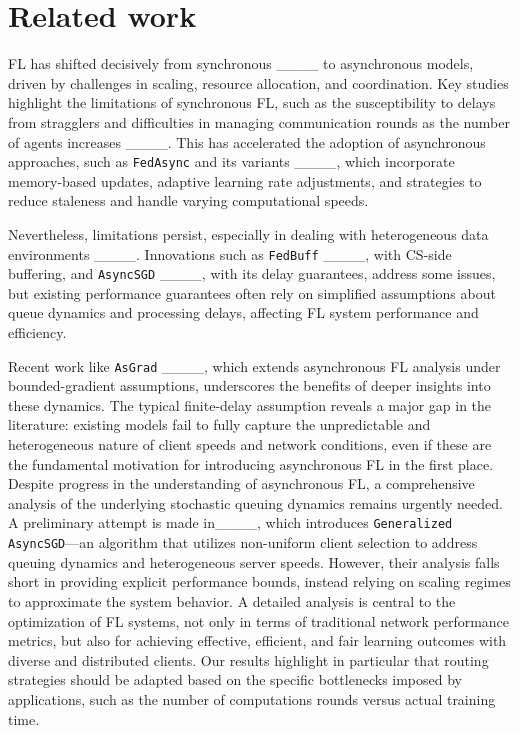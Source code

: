 \section{Related work}
\label{sec:related-work}

\gls{FL} has shifted decisively from synchronous ____ to asynchronous models, driven by challenges in scaling, resource allocation, and coordination. Key studies highlight the limitations of synchronous \gls{FL}, such as the susceptibility to delays from stragglers and difficulties in managing communication rounds as the number of agents increases ____. This has accelerated the adoption of asynchronous approaches, such as \texttt{FedAsync} and its variants ____, which incorporate memory-based updates, adaptive learning rate adjustments, and strategies to reduce staleness and handle varying computational speeds.

Nevertheless, limitations persist, especially in dealing with heterogeneous data environments ____. Innovations such as \texttt{FedBuff} ____, with \gls{CS}-side buffering, and \texttt{AsyncSGD} ____, with its delay guarantees, address some issues, but existing performance guarantees often rely on simplified assumptions about queue dynamics and processing delays, affecting \gls{FL} system performance and efficiency.

Recent work like \texttt{AsGrad} ____, which extends asynchronous \gls{FL} analysis under bounded-gradient assumptions, underscores the benefits of deeper insights into these dynamics. The typical finite-delay assumption reveals a major gap in the literature: existing models fail to fully capture the unpredictable and heterogeneous nature of client speeds and network conditions, even if these are the fundamental motivation for introducing asynchronous \gls{FL} in the first place. Despite progress in the understanding of asynchronous FL, a comprehensive analysis of the underlying stochastic queuing dynamics remains urgently needed.
A preliminary attempt is made in____, which introduces \texttt{Generalized AsyncSGD}—an algorithm that utilizes non-uniform client selection to address queuing dynamics and heterogeneous server speeds. However, their analysis falls short in providing explicit performance bounds, instead relying on scaling regimes to approximate the system behavior. A detailed analysis is central to the optimization of \gls{FL} systems, not only in terms of traditional network performance metrics, but also for achieving effective, efficient, and fair learning outcomes with diverse and distributed clients.
Our results highlight in particular that routing strategies should be adapted based on the specific bottlenecks imposed by applications, such as the number of computations rounds versus actual training time.